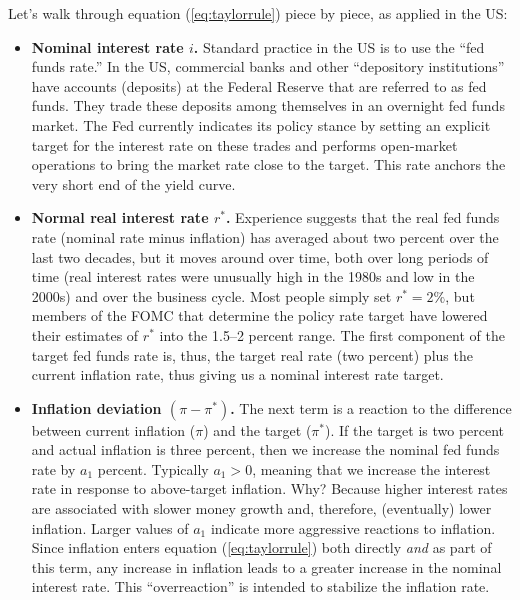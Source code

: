 Let's walk through equation (\ref{eq:taylorrule}) piece by piece,
as applied in the US:
%
\begin{itemize}
\item \textbf{Nominal interest rate $i$.}
Standard practice in the US is to use the ``fed funds rate.''
In the US, commercial banks and other ``depository institutions'' have accounts (deposits) at the Federal Reserve that are referred to as fed funds.  They trade these deposits among themselves in an
overnight fed funds market.
The Fed currently indicates its policy stance by setting an explicit
target for the interest rate on these trades
and performs open-market operations
to bring the market rate close to the target.
This rate anchors the very short end of the yield 
 curve.

\item \textbf{Normal real interest rate $r^*$.}  Experience suggests that the real fed funds rate (nominal rate minus inflation) has averaged about two percent over the last two decades, but it moves around over time, both over long periods of time
(real interest rates were unusually high in the 1980s
and low in the 2000s)
and over the business cycle.
Most people simply set $r^* = 2\%$, but members of the FOMC that determine the policy rate target have lowered their estimates of $r^*$ into the 1.5--2 percent range.
The first component of the target fed funds rate is,
thus, the target real rate (two percent) plus the current inflation rate, thus giving us a nominal interest rate target.

\item \textbf{Inflation deviation $(\pi - \pi^*)$.}  The next term is a reaction to the difference between current inflation ($\pi$)
    and the target ($\pi^*$).
If the target is two percent and actual inflation is three percent, then we
increase the nominal fed funds rate by $a_1$ percent.
Typically $a_1 > 0$, meaning that we increase the
interest rate in response to above-target inflation.
Why?  Because higher interest rates are associated with slower money growth
and, therefore, (eventually) lower inflation.
Larger values of $a_1$ indicate more aggressive reactions to inflation.
Since inflation enters equation (\ref{eq:taylorrule}) both directly \emph{and} as part of this term,
any increase in inflation leads to a greater increase in the nominal
interest rate.
This ``overreaction'' is intended to stabilize the inflation rate.


\end{itemize}
